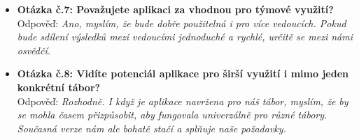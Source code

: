 \documentclass[a4paper, 12pt]{article} %
\begin{document}
\begin{itemize}
    \item \textbf{Otázka č.7: Považujete aplikaci za vhodnou pro týmové využití?} \\
    Odpověď: \textit{Ano, myslím, že bude dobře použitelná i pro více vedoucích. Pokud bude 
    sdílení výsledků mezi vedoucími jednoduché a rychlé, určitě se mezi námi osvědčí.}

    \item \textbf{Otázka č.8: Vidíte potenciál aplikace pro širší využití i mimo jeden 
    konkrétní tábor?} \\
    Odpověď: \textit{Rozhodně. I když je aplikace navržena pro náš tábor, myslím, že by se 
    mohla časem přizpůsobit, aby fungovala univerzálně pro různé tábory. Současná verze nám 
    ale bohatě stačí a splňuje naše požadavky.}

\end{itemize}
\end{document}
